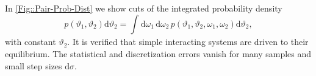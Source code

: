 	In \autoref{Fig::Pair-Prob-Dist} we show cuts of the integrated probability density 
	\begin{equation}
		p(\vartheta_1, \vartheta_2) \text{d}\vartheta_2 =	\int_{}\text{d}\omega_1 \,\text{d} \omega_2\, p(\vartheta_1, \vartheta_2, \omega_1, \omega_2) \text{d} \vartheta_2,
	\end{equation}
	 with constant $\vartheta_2$. It is verified that simple interacting systems are driven to their equilibrium. The statistical and discretization errors vanish for many samples and small step sizes $\text{d}\sigma$.	
	\begin{figure}[htp]
		\begin{subfigure}{0.48\textwidth}
			\centering
			
		\end{subfigure}
		\begin{subfigure}{0.48\textwidth}
			\centering
			
		\end{subfigure} \\
		\begin{subfigure}{0.48\textwidth}
			\centering
			
		\end{subfigure}
		\begin{subfigure}{0.48\textwidth}
			\centering
			
		\end{subfigure} \\
		\begin{subfigure}{0.48\textwidth}
			\centering
			
		\end{subfigure}
		\begin{subfigure}{0.48\textwidth}
			\centering
			
		\end{subfigure} 

\end{figure}
